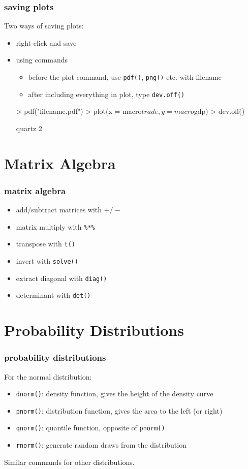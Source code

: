 \documentclass[handout]{beamer}
\newcommand{\red}{\color{red}}
\begin{document}
\begin{frame}[fragile]
\frametitle{saving plots}
Two ways of saving plots:
\pause
\bigskip
\begin{itemize}
\item right-click and save
\pause
\item using commands
\pause
\begin{itemize}
\item before the plot command, use {\tt \red pdf()}, {\tt \red png()} etc. with filename
\item after including everything in plot, type {\tt dev.off()}
\end{itemize}
\pause
\red
\footnotesize
\begin{Schunk}
\begin{Sinput}
> pdf("filename.pdf")
> plot(x = macro$trade, y = macro$gdp)
> dev.off()
\end{Sinput}
\begin{Soutput}
quartz 
     2 
\end{Soutput}
\end{Schunk}
\end{itemize}
\end{frame}

\section{Matrix Algebra}
\begin{frame}[fragile]
\frametitle{matrix algebra}
\pause
\begin{itemize}
\item add/subtract matrices with {\tt \red $+/-$}
\pause
\item matrix multiply with {\tt \red \%*\%}
\pause
\item transpose with {\tt \red t()}
\pause
\item invert with {\tt \red solve()}
\pause
\item extract diagonal with {\tt \red diag()}
\pause
\item determinant with {\tt \red det()}
\end{itemize}
\end{frame}

\section{Probability Distributions}
\begin{frame}[fragile]
\frametitle{probability distributions}
For the normal distribution:
\bigskip
\begin{itemize}
\item {\tt \red dnorm()}: density function, gives the height of the density curve
\pause
\item {\tt \red pnorm()}: distribution function, gives the area to the left (or right)
\pause
\item {\tt \red qnorm()}: quantile function, opposite of {\tt \red pnorm()}
\pause
\item {\tt \red rnorm()}: generate random draws from the distribution
\end{itemize}
\pause
\bigskip
Similar commands for other distributions.
\end{frame}
\end{document}
